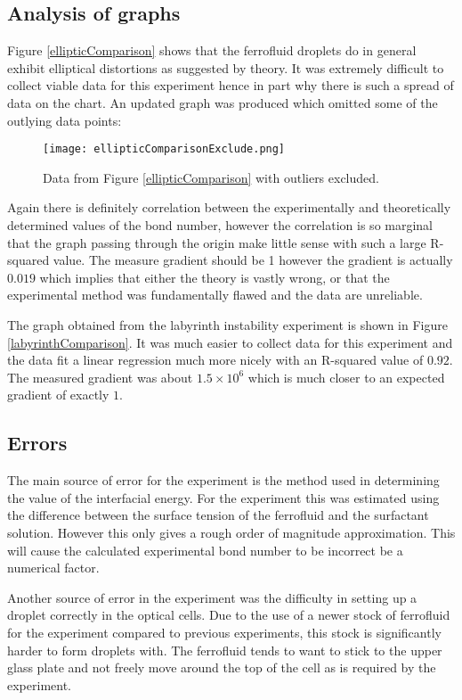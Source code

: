 \documentclass[12pt]{article}
\begin{document}
\subsection{Analysis of graphs}
Figure \ref{ellipticComparison} shows that the ferrofluid droplets do in general exhibit elliptical distortions as suggested by theory. It was extremely difficult to collect viable data for this experiment hence in part why there is such a spread of data on the chart. An updated graph was produced which omitted some of the outlying data points:
\begin{figure}[H]
\centering
\texttt{[image: ellipticComparisonExclude.png]}
\caption{Data from Figure \ref{ellipticComparison} with outliers excluded.}
\label{ellipticComparisonExclude}
\end{figure}
Again there is definitely correlation between the experimentally and theoretically determined values of the bond number, however the correlation is so marginal that the graph passing through the origin make little sense with such a large R-squared value. The measure gradient should be 1 however the gradient is actually $0.019$ which implies that either the theory is vastly wrong, or that the experimental method was fundamentally flawed and the data are unreliable.

The graph obtained from the labyrinth instability experiment is shown in Figure \ref{labyrinthComparison}. It was much easier to collect data for this experiment and the data fit a linear regression much more nicely with an R-squared value of $0.92$. The measured gradient was about $1.5\times10^6$ which is much closer to an expected gradient of exactly $1$.

\subsection{Errors}

The main source of error for the experiment is the method used in determining the value of the interfacial energy. For the experiment this was estimated using the difference between the surface tension of the ferrofluid and the surfactant solution. However this only gives a rough order of magnitude approximation. This will cause the calculated experimental bond number to be incorrect be a numerical factor.

Another source of error in the experiment was the difficulty in setting up a droplet correctly in the optical cells. Due to the use of a newer stock of ferrofluid for the experiment compared to previous experiments, this stock is significantly harder to form droplets with. The ferrofluid tends to want to stick to the upper glass plate and not freely move around the top of the cell as is required by the experiment.
\end{document}
